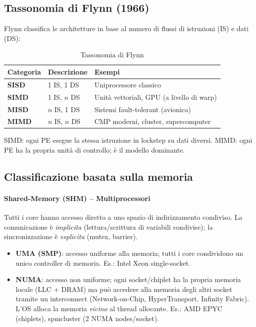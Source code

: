 \documentclass[11pt,a4paper]{article}
\theoremstyle{remark}
\begin{document}
\subsection{Tassonomia di Flynn (1966)}

Flynn classifica le architetture in base al numero di flussi di istruzioni (IS) e dati (DS):

\begin{table}[H]
\centering
\begin{tabular}{lll}
\toprule
Categoria & Descrizione & Esempi \\
\midrule
\textbf{SISD} & 1 IS, 1 DS & Uniprocessore classico \\
\textbf{SIMD} & 1 IS, $n$ DS & Unità vettoriali, GPU (a livello di warp) \\
\textbf{MISD} & $n$ IS, 1 DS & Sistemi fault-tolerant (avionica) \\
\textbf{MIMD} & $n$ IS, $n$ DS & CMP moderni, cluster, supercomputer \\
\bottomrule
\end{tabular}
\caption{Tassonomia di Flynn}
\end{table}

SIMD: ogni PE esegue la stessa istruzione in lockstep su dati diversi.
MIMD: ogni PE ha la propria unità di controllo; è il modello dominante.

\subsection{Classificazione basata sulla memoria}

\paragraph{Shared-Memory (SHM) -- Multiprocessori}
Tutti i core hanno accesso diretto a uno spazio di indirizzamento condiviso. La comunicazione è \emph{implicita} (lettura/scrittura di variabili condivise); la sincronizzazione è \emph{esplicita} (mutex, barrier).

\begin{itemize}
  \item \textbf{UMA (SMP)}: accesso uniforme alla memoria; tutti i core condividono un unico controller di memoria.
    Es.: Intel Xeon single-socket.
  \item \textbf{NUMA}: accesso non uniforme; ogni socket/chiplet ha la propria memoria locale (LLC + DRAM) ma può accedere alla memoria degli altri socket tramite un interconnect (Network-on-Chip, HyperTransport, Infinity Fabric). L'OS alloca la memoria \emph{vicino} al thread allocante.
    Es.: AMD EPYC (chiplets), spmcluster (2 NUMA nodes/socket).
\end{itemize}
\end{document}
